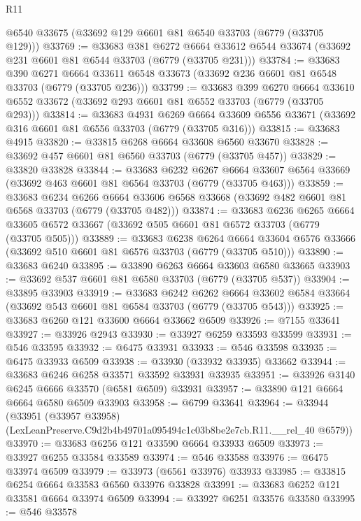 \begin{lexlean}{R11}
\begin{coremodule}
    @6540
    @33675
    (@33692 @129 @6601 @81 @6540 @33703 (@6779 (@33705 @129)))
@33769 := @33683
    @381
    @6272
    @6664
    @33612
    @6544
    @33674
    (@33692 @231 @6601 @81 @6544 @33703 (@6779 (@33705 @231)))
@33784 := @33683
    @390
    @6271
    @6664
    @33611
    @6548
    @33673
    (@33692 @236 @6601 @81 @6548 @33703 (@6779 (@33705 @236)))
@33799 := @33683
    @399
    @6270
    @6664
    @33610
    @6552
    @33672
    (@33692 @293 @6601 @81 @6552 @33703 (@6779 (@33705 @293)))
@33814 := @33683
    @4931
    @6269
    @6664
    @33609
    @6556
    @33671
    (@33692 @316 @6601 @81 @6556 @33703 (@6779 (@33705 @316)))
@33815 := @33683 @4915
@33820 := @33815 @6268 @6664 @33608 @6560 @33670
@33828 := @33692 @457 @6601 @81 @6560 @33703 (@6779 (@33705 @457))
@33829 := @33820 @33828
@33844 := @33683
    @6232
    @6267
    @6664
    @33607
    @6564
    @33669
    (@33692 @463 @6601 @81 @6564 @33703 (@6779 (@33705 @463)))
@33859 := @33683
    @6234
    @6266
    @6664
    @33606
    @6568
    @33668
    (@33692 @482 @6601 @81 @6568 @33703 (@6779 (@33705 @482)))
@33874 := @33683
    @6236
    @6265
    @6664
    @33605
    @6572
    @33667
    (@33692 @505 @6601 @81 @6572 @33703 (@6779 (@33705 @505)))
@33889 := @33683
    @6238
    @6264
    @6664
    @33604
    @6576
    @33666
    (@33692 @510 @6601 @81 @6576 @33703 (@6779 (@33705 @510)))
@33890 := @33683 @6240
@33895 := @33890 @6263 @6664 @33603 @6580 @33665
@33903 := @33692 @537 @6601 @81 @6580 @33703 (@6779 (@33705 @537))
@33904 := @33895 @33903
@33919 := @33683
    @6242
    @6262
    @6664
    @33602
    @6584
    @33664
    (@33692 @543 @6601 @81 @6584 @33703 (@6779 (@33705 @543)))
@33925 := @33683 @6260 @121 @33600 @6664 @33662 @6509
@33926 := @7155 @33641
@33927 := @33926 @2943
@33930 := @33927 @6259 @33593 @33599
@33931 := @546 @33595
@33932 := @6475 @33931
@33933 := @546 @33598
@33935 := @6475 @33933 @6509
@33938 := @33930 (@33932 @33935) @33662
@33944 := @33683 @6246 @6258 @33571 @33592 @33931 @33935
@33951 := @33926 @3140 @6245 @6666 @33570 (@6581 @6509) @33931
@33957 := @33890 @121 @6664 @6664 @6580 @6509 @33903
@33958 := @6799 @33641
@33964 := @33944
    (@33951 (@33957 @33958) (LexLeanPreserve.C9d2b4b49701a095494c1c03b8be2e7cb.R11.__rel_40 @6579))
@33970 := @33683 @6256 @121 @33590 @6664 @33933 @6509
@33973 := @33927 @6255 @33584 @33589
@33974 := @546 @33588
@33976 := @6475 @33974 @6509
@33979 := @33973 (@6561 @33976) @33933
@33985 := @33815 @6254 @6664 @33583 @6560 @33976 @33828
@33991 := @33683 @6252 @121 @33581 @6664 @33974 @6509
@33994 := @33927 @6251 @33576 @33580
@33995 := @546 @33578

\end{coremodule}
\end{lexlean}
